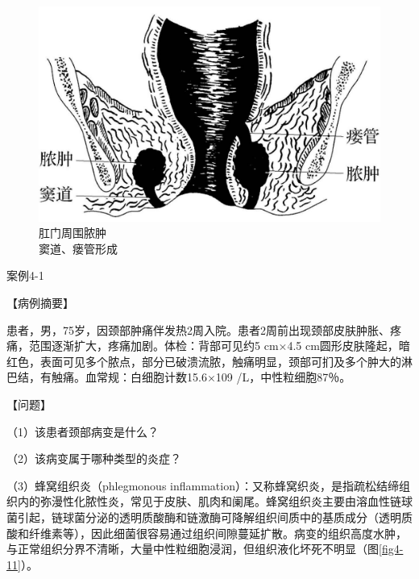 \begin{figure}[!htbp]
  \centering
  \includegraphics{./images/Image00061.jpg}
  \caption{肛门周围脓肿 \\ {\small 窦道、瘘管形成}}
  \label{fig4-10}
\end{figure}


\begin{framed}
  {案例4-1}

  {【病例摘要】}

  患者，男，75岁，因颈部肿痛伴发热2周入院。患者2周前出现颈部皮肤肿胀、疼痛，范围逐渐扩大，疼痛加剧。体检：背部可见约5
  cm×4.5
  cm圆形皮肤隆起，暗红色，表面可见多个脓点，部分已破溃流脓，触痛明显，颈部可扪及多个肿大的淋巴结，有触痛。血常规：白细胞计数15.6×10{9}
  /L，中性粒细胞87％。

  {【问题】}

  （1）该患者颈部病变是什么？

  （2）该病变属于哪种类型的炎症？
\end{framed}

（3）蜂窝组织炎（phlegmonous
inflammation）：又称蜂窝织炎，是指疏松结缔组织内的弥漫性化脓性炎，常见于皮肤、肌肉和阑尾。蜂窝组织炎主要由溶血性链球菌引起，链球菌分泌的透明质酸酶和链激酶可降解组织间质中的基质成分（透明质酸和纤维素等），因此细菌很容易通过组织间隙蔓延扩散。病变的组织高度水肿，与正常组织分界不清晰，大量中性粒细胞浸润，但组织液化坏死不明显（图\ref{fig4-11}）。

